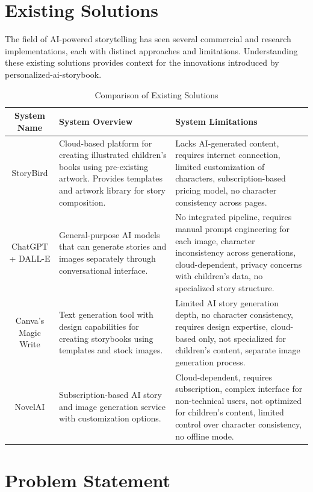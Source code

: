 \section{Existing Solutions}

The field of AI-powered storytelling has seen several commercial and research implementations, each with distinct approaches and limitations. Understanding these existing solutions provides context for the innovations introduced by personalized-ai-storybook.

\begin{table}[H]
\centering
\caption{Comparison of Existing Solutions}
\begin{tabular}{|c|p{5cm}|p{5cm}|}
\hline
\textbf{System Name} & \textbf{System Overview} & \textbf{System Limitations} \\ \hline
StoryBird & Cloud-based platform for creating illustrated children's books using pre-existing artwork. Provides templates and artwork library for story composition. & Lacks AI-generated content, requires internet connection, limited customization of characters, subscription-based pricing model, no character consistency across pages. \\ \hline
ChatGPT + DALL-E & General-purpose AI models that can generate stories and images separately through conversational interface. & No integrated pipeline, requires manual prompt engineering for each image, character inconsistency across generations, cloud-dependent, privacy concerns with children's data, no specialized story structure. \\ \hline
Canva's Magic Write & Text generation tool with design capabilities for creating storybooks using templates and stock images. & Limited AI story generation depth, no character consistency, requires design expertise, cloud-based only, not specialized for children's content, separate image generation process. \\ \hline
NovelAI & Subscription-based AI story and image generation service with customization options. & Cloud-dependent, requires subscription, complex interface for non-technical users, not optimized for children's content, limited control over character consistency, no offline mode. \\ \hline
\end{tabular}
\label{tab:system_comparison}
\end{table}

\section{Problem Statement}

